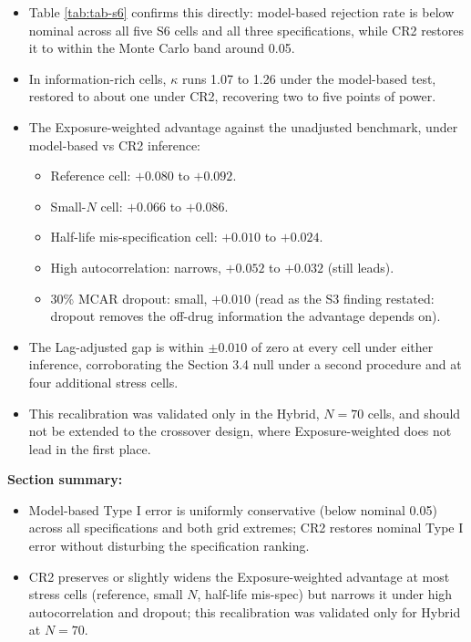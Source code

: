 \documentclass[
  11pt,
]{article}
\providecommand{\tightlist}{%
  \setlength{\itemsep}{0pt}\setlength{\parskip}{0pt}}
\begin{document}
\begin{itemize}
\tightlist
\item
  Table \ref{tab:tab-s6} confirms this directly: model-based
  rejection rate is below nominal across all five S6 cells and all
  three specifications, while CR2 restores it to within the Monte
  Carlo band around 0.05.
\item
  In information-rich cells, \(\kappa\) runs 1.07 to 1.26 under the
  model-based test, restored to about one under CR2, recovering two
  to five points of power.
\item
  The Exposure-weighted advantage against the unadjusted benchmark,
  under model-based vs CR2 inference:

  \begin{itemize}
  \tightlist
  \item
    Reference cell: \(+0.080\) to \(+0.092\).
  \item
    Small-\(N\) cell: \(+0.066\) to \(+0.086\).
  \item
    Half-life mis-specification cell: \(+0.010\) to \(+0.024\).
  \item
    High autocorrelation: narrows, \(+0.052\) to \(+0.032\) (still
    leads).
  \item
    30\% MCAR dropout: small, \(+0.010\) (read as the S3 finding
    restated: dropout removes the off-drug information the advantage
    depends on).
  \end{itemize}
\item
  The Lag-adjusted gap is within \(\pm 0.010\) of zero at every cell
  under either inference, corroborating the Section 3.4 null under a
  second procedure and at four additional stress cells.
\item
  This recalibration was validated only in the Hybrid, \(N=70\) cells,
  and should not be extended to the crossover design, where
  Exposure-weighted does not lead in the first place.
\end{itemize}

\textbf{Section summary:}

\begin{itemize}
\tightlist
\item
  Model-based Type I error is uniformly conservative (below nominal
  0.05) across all specifications and both grid extremes; CR2
  restores nominal Type I error without disturbing the specification
  ranking.
\item
  CR2 preserves or slightly widens the Exposure-weighted advantage at
  most stress cells (reference, small \(N\), half-life mis-spec) but
  narrows it under high autocorrelation and dropout; this
  recalibration was validated only for Hybrid at \(N=70\).
\end{itemize}
\end{document}
